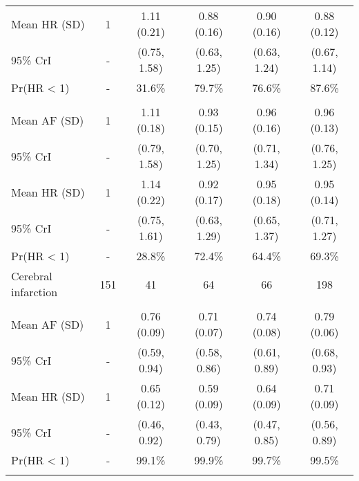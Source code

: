 \documentclass[nutrients,article,submitted,moreauthors,pdftex]{mdpi}
\begin{document}
\begin{table}[H]
{\begin{tabular}[t]{lccccc}
\rowcolor{gray!6}  \hspace{1em}Mean HR (SD) & 1 & 1.11 (0.21) & 0.88 (0.16) & 0.90 (0.16) & 0.88 (0.12)\\
\hspace{1em}95\% CrI & - & (0.75, 1.58) & (0.63, 1.25) & (0.63, 1.24) & (0.67, 1.14)\\
\rowcolor{gray!6}  \hspace{1em}Pr(HR < 1) & - & 31.6\% & 79.7\% & 76.6\% & 87.6\%\\
\addlinespace[0.3em]
\multicolumn{6}{l}{\textbf{Model 2}}\\
\hspace{1em}Mean AF (SD) & 1 & 1.11 (0.18) & 0.93 (0.15) & 0.96 (0.16) & 0.96 (0.13)\\
\rowcolor{gray!6}  \hspace{1em}95\% CrI & - & (0.79, 1.58) & (0.70, 1.25) & (0.71, 1.34) & (0.76, 1.25)\\
\hspace{1em}Mean HR (SD) & 1 & 1.14 (0.22) & 0.92 (0.17) & 0.95 (0.18) & 0.95 (0.14)\\
\rowcolor{gray!6}  \hspace{1em}95\% CrI & - & (0.75, 1.61) & (0.63, 1.29) & (0.65, 1.37) & (0.71, 1.27)\\
\hspace{1em}Pr(HR < 1) & - & 28.8\% & 72.4\% & 64.4\% & 69.3\%\\
\hline
\rowcolor{gray!6}  Cerebral infarction & 151 & 41 & 64 & 66 & 198\\
\addlinespace[0.3em]
\multicolumn{6}{l}{\textbf{Model 0}}\\
\hspace{1em}Mean AF (SD) & 1 & 0.76 (0.09) & 0.71 (0.07) & 0.74 (0.08) & 0.79 (0.06)\\
\rowcolor{gray!6}  \hspace{1em}95\% CrI & - & (0.59, 0.94) & (0.58, 0.86) & (0.61, 0.89) & (0.68, 0.93)\\
\hspace{1em}Mean HR (SD) & 1 & 0.65 (0.12) & 0.59 (0.09) & 0.64 (0.09) & 0.71 (0.09)\\
\rowcolor{gray!6}  \hspace{1em}95\% CrI & - & (0.46, 0.92) & (0.43, 0.79) & (0.47, 0.85) & (0.56, 0.89)\\
\hspace{1em}Pr(HR < 1) & - & 99.1\% & 99.9\% & 99.7\% & 99.5\%\\
\addlinespace[0.3em]
\multicolumn{6}{l}{\textbf{Model 1}}\\

\end{tabular}}
\end{table}
\end{document}
